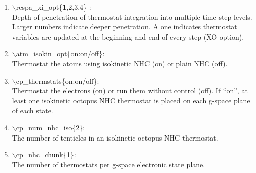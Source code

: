 \documentclass[12pt,titlepage]{article}
\begin{document}
\begin{enumerate}
 \vspace{0.15in}
 \item   $\backslash$respa\_xi\_opt\{{\bf 1},2,3,4\} : \\
   Depth of penetration of thermostat integration into multiple time step
   levels.  Larger numbers indicate deeper penetration.  A one indicates
   thermostat variables are updated at the beginning and end of 
   every step (XO option).

 \vspace{0.15in}
 \item   $\backslash$atm\_isokin\_opt\{on:on/off\}: \\
    Thermostat the atoms using isokinetic NHC (on) or plain NHC (off).

 \vspace{0.15in}
 \item   $\backslash$cp\_thermstats\{on:on/off\}: \\
    Thermostat the electrons (on) or run them without control (off).
    If ``on'', at least one isokinetic octopus NHC thermostat is placed on each
    g-space plane of each state.

 \vspace{0.15in}
 \item   $\backslash$cp\_num\_nhc\_iso\{2\}: \\
    The number of tenticles in an isokinetic octopus NHC thermostat.

 \vspace{0.15in}
 \item   $\backslash$cp\_nhc\_chunk\{1\}: \\
    The number of thermostats per g-space electronic state plane.
\end{enumerate}

\newpage
\end{document}
